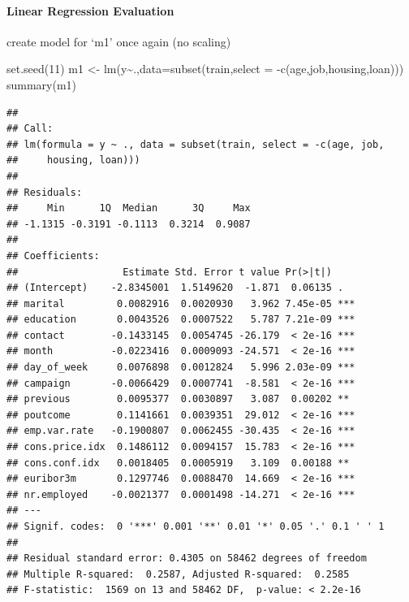 \documentclass[
]{article}
\newenvironment{Shaded}{\begin{snugshade}}{\end{snugshade}}
\newcommand{\AttributeTok}[1]{\textcolor[rgb]{0.77,0.63,0.00}{#1}}
\newcommand{\DecValTok}[1]{\textcolor[rgb]{0.00,0.00,0.81}{#1}}
\newcommand{\FunctionTok}[1]{\textcolor[rgb]{0.00,0.00,0.00}{#1}}
\newcommand{\NormalTok}[1]{#1}
\newcommand{\OtherTok}[1]{\textcolor[rgb]{0.56,0.35,0.01}{#1}}
\newcommand{\SpecialCharTok}[1]{\textcolor[rgb]{0.00,0.00,0.00}{#1}}
\begin{document}
\hypertarget{linear-regression-evaluation}{%
\paragraph{Linear Regression
Evaluation}\label{linear-regression-evaluation}}

create model for `m1' once again (no scaling)

\begin{Shaded}
\begin{Highlighting}[]
\FunctionTok{set.seed}\NormalTok{(}\DecValTok{11}\NormalTok{)}
\NormalTok{m1 }\OtherTok{\textless{}{-}} \FunctionTok{lm}\NormalTok{(y}\SpecialCharTok{\textasciitilde{}}\NormalTok{.,}\AttributeTok{data=}\FunctionTok{subset}\NormalTok{(train,}\AttributeTok{select =} \SpecialCharTok{{-}}\FunctionTok{c}\NormalTok{(age,job,housing,loan)))}
\FunctionTok{summary}\NormalTok{(m1)}
\end{Highlighting}
\end{Shaded}

\begin{verbatim}
## 
## Call:
## lm(formula = y ~ ., data = subset(train, select = -c(age, job, 
##     housing, loan)))
## 
## Residuals:
##     Min      1Q  Median      3Q     Max 
## -1.1315 -0.3191 -0.1113  0.3214  0.9087 
## 
## Coefficients:
##                  Estimate Std. Error t value Pr(>|t|)    
## (Intercept)    -2.8345001  1.5149620  -1.871  0.06135 .  
## marital         0.0082916  0.0020930   3.962 7.45e-05 ***
## education       0.0043526  0.0007522   5.787 7.21e-09 ***
## contact        -0.1433145  0.0054745 -26.179  < 2e-16 ***
## month          -0.0223416  0.0009093 -24.571  < 2e-16 ***
## day_of_week     0.0076898  0.0012824   5.996 2.03e-09 ***
## campaign       -0.0066429  0.0007741  -8.581  < 2e-16 ***
## previous        0.0095377  0.0030897   3.087  0.00202 ** 
## poutcome        0.1141661  0.0039351  29.012  < 2e-16 ***
## emp.var.rate   -0.1900807  0.0062455 -30.435  < 2e-16 ***
## cons.price.idx  0.1486112  0.0094157  15.783  < 2e-16 ***
## cons.conf.idx   0.0018405  0.0005919   3.109  0.00188 ** 
## euribor3m       0.1297746  0.0088470  14.669  < 2e-16 ***
## nr.employed    -0.0021377  0.0001498 -14.271  < 2e-16 ***
## ---
## Signif. codes:  0 '***' 0.001 '**' 0.01 '*' 0.05 '.' 0.1 ' ' 1
## 
## Residual standard error: 0.4305 on 58462 degrees of freedom
## Multiple R-squared:  0.2587, Adjusted R-squared:  0.2585 
## F-statistic:  1569 on 13 and 58462 DF,  p-value: < 2.2e-16
\end{verbatim}
\end{document}
